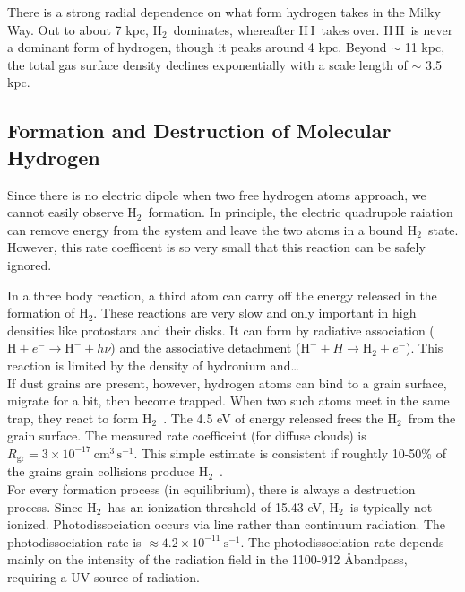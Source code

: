 \documentclass[10pt]{article}
\numberwithin{equation}{section}
\newcommand{\n}{\noindent}
\newcommand{\HI}{H\,I\ }
\newcommand{\HII}{H\,II\ }
\newcommand{\Htwo}{H$_2$\ }
\begin{document}
  \n There is a strong radial dependence on what form hydrogen takes in the
  Milky Way. Out to about 7 kpc, \Htwo dominates, whereafter \HI takes over.
  \HII is never a dominant form of hydrogen, though it peaks around 4 kpc.
  Beyond $\sim$ 11 kpc, the total gas surface density declines exponentially
  with a scale length of $\sim$ 3.5 kpc.
  \subsection{Formation and Destruction of Molecular Hydrogen} %
  \label{sub:formation_of_molecular_hydrogen}
  Since there is no electric dipole when two free hydrogen atoms approach, we
  cannot easily observe \Htwo formation. In principle, the electric quadrupole
  raiation can remove energy from the system and leave the two atoms in a bound
  \Htwo state. However, this rate coefficent is so very small that this
  reaction can be safely ignored.

  \n In a three body reaction, a third atom can carry off the energy released
  in the formation of $\mathrm{H}_2$. These reactions are very slow and only
  important in high densities like protostars and their disks. It can form by
  radiative association ($\mathrm{H} + e^- \to \mathrm{H}^- + h\nu$) and the
  associative detachment ($\mathrm{H}^- + H \to \mathrm{H}_2 + e^-$). This
  reaction is limited by the density of hydronium and\ldots\\
  
  \n If dust grains are present, however, hydrogen atoms can bind to a grain
  surface, migrate for a bit, then become trapped. When two such atoms meet in
  the same trap, they react to form \Htwo. The 4.5 eV of energy released frees
  the \Htwo from the grain surface. The measured rate coefficeint (for diffuse
  clouds) is $R_{\mathrm{gr}} = 3\times 10^{-17}\ \mathrm{cm^3\,s^{-1}}$. This
  simple estimate is consistent if roughtly 10-50\% of the grains grain
  collisions produce \Htwo.\\
  
  \n For every formation process (in equilibrium), there is always a
  destruction process. Since \Htwo has an ionization threshold of 15.43 eV,
  \Htwo is typically not ionized. Photodissociation occurs via line rather than
  continuum radiation. The photodissociation rate is $\approx 4.2\times
  10^{-11}\ \mathrm{s^{-1}}$. The photodissociation rate depends mainly on the
  intensity of the radiation field in the 1100-912 \AA bandpass, requiring a UV
  source of radiation.\\
  
\end{document}
